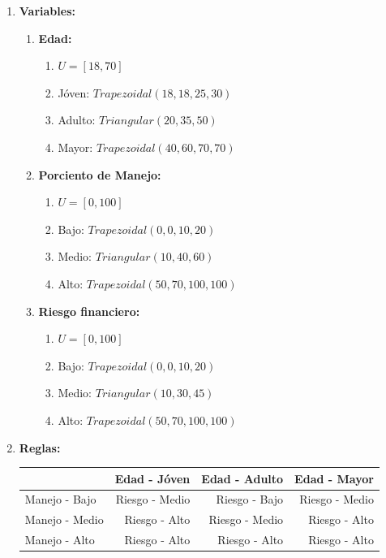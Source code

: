 \documentclass[10pt,letterpaper]{article}
\begin{document}
\begin{enumerate}
	\item \textbf{Variables:}
		\begin{enumerate}
			\item[] \textbf{Edad:}
				\begin{enumerate}
					\item[] $U = [18, 70]$
					\item[] Jóven: $Trapezoidal(18, 18, 25, 30)$
					\item[] Adulto: $Triangular(20, 35, 50)$
					\item[] Mayor: $Trapezoidal(40, 60, 70, 70)$
				\end{enumerate}
			
			\item[]	\textbf{Porciento de Manejo:}
				\begin{enumerate}
					\item[] $U = [0, 100]$
					\item[] Bajo: $Trapezoidal(0, 0, 10, 20)$
					\item[] Medio: $Triangular(10, 40, 60)$
					\item[] Alto: $Trapezoidal(50, 70, 100, 100)$
				\end{enumerate}
			
			\item[] \textbf{Riesgo financiero:}
				\begin{enumerate}
					\item[] $U = [0, 100]$
					\item[] Bajo: $Trapezoidal(0, 0, 10, 20)$
					\item[] Medio: $Triangular(10, 30, 45)$
					\item[] Alto: $Trapezoidal(50, 70, 100, 100)$
				\end{enumerate}
		\end{enumerate}

	\item \textbf{Reglas:}\\

		\begin{tabular}{ |l|r|r|r| }
			\hline
			& Edad - Jóven & Edad - Adulto & Edad - Mayor\\
			\hline
			 Manejo - Bajo & Riesgo - Medio & Riesgo - Bajo & Riesgo - Medio\\
			\hline
			Manejo - Medio & Riesgo - Alto & Riesgo - Medio & Riesgo - Alto\\
			\hline
			Manejo - Alto & Riesgo - Alto & Riesgo - Alto & Riesgo - Alto\\
			\hline
		\end{tabular}



\end{enumerate}
\end{document}
